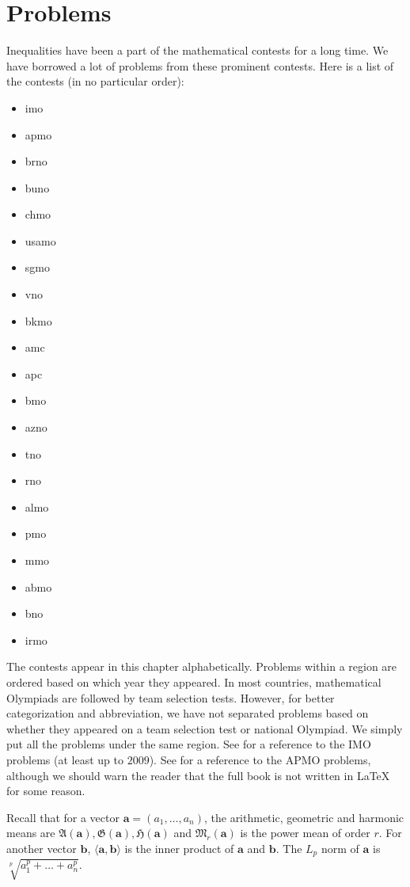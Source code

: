 \documentclass{subfile}
\begin{document}
	\chapter{Problems}\label{ch:problems}
	Inequalities have been a part of the mathematical contests for a long time. We have borrowed a lot of problems from these prominent contests. Here is a list of the contests (in no particular order):
		\begin{itemize}
			\item \Gls{imo}
			\item \Gls{apmo}
			\item \Gls{brno}
			\item \Gls{buno}
			\item \Gls{chmo}
			\item \Gls{usamo}
			\item \Gls{sgmo}
			\item \Gls{vno}
			\item \Gls{bkmo}
			\item \Gls{amc}
			\item \Gls{apc}
			\item \Gls{bmo}
			\item \Gls{azno}
			\item \Gls{tno}
			\item \Gls{rno}
			\item \Gls{almo}
			\item \Gls{pmo}
			\item \Gls{mmo}
			\item \Gls{abmo}
			\item \Gls{bno}
			\item \Gls{irmo}
		\end{itemize}
	The contests appear in this chapter alphabetically. Problems within a region are ordered based on which year they appeared. In most countries, mathematical Olympiads are followed by team selection tests. However, for better categorization and abbreviation, we have not separated problems based on whether they appeared on a team selection test or national Olympiad. We simply put all the problems under the same region. See \textcite{djukicc_jankovic_matic_2011} for a reference to the IMO problems (at least up to $2009$). See \textcite{dongphd_suugaku_2009} for a reference to the APMO problems, although we should warn the reader that the full book is not written in \LaTeX{} for some reason.
	
	Recall that for a vector $\mathbf{a}=(a_{1},\ldots,a_{n})$, the arithmetic, geometric and harmonic means are $\mathfrak{A}(\mathbf{a}),\mathfrak{G}(\mathbf{a}),\mathfrak{H}(\mathbf{a})$ and $\mathfrak{M}_r(\mathbf{a})$ is the power mean of order $r$. For another vector $\mathbf{b}$, $\langle\mathbf{a},\mathbf{b}\rangle$ is the inner product of $\mathbf{a}$ and $\mathbf{b}$. The $L_{p}$ norm of $\mathbf{a}$ is $\sqrt[p]{a_{1}^{p}+\ldots+a_{n}^{p}}$.
	
\end{document}

